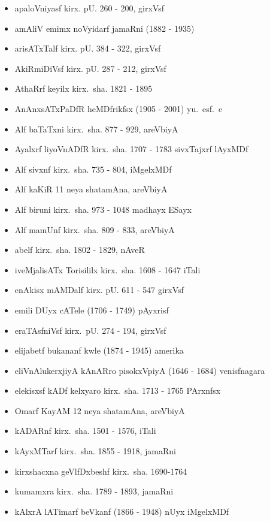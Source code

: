{\renewcommand\labelitemi{}
\begin{itemize}
\item apaloVniyasf kirx. pU. {\rm 260 - 200}, girxVsf
\item amAliV emimx noVyidarf jamaRni {\rm (1882 - 1935)}
\item arisATxTalf kirx. pU. {\rm 384 - 322}, girxVsf
\item AkiRmiDiVsf kirx. pU. {\rm 287 - 212}, girxVsf
\item AthaRrf keyilx kirx.~sha. {\rm 1821 - 1895}
\item AnAnxsATxPaDfR heMDfrikfsx {\rm (1905 - 2001)} yu.~esf.~e
\item Alf baTaTxni kirx.~sha. {\rm 877 - 929}, areVbiyA
\item Ayalxrf liyoVnADfR kirx.~sha. {\rm 1707 - 1783} sivxTajxrf lAyxMDf
\item Alf sivxnf kirx.~sha. {\rm 735 - 804}, iMgelxMDf
\item Alf kaKiR {\rm 11} neya shatamAna, areVbiyA
\item Alf biruni kirx.~sha. {\rm 973 - 1048} madhayx ESayx
\item Alf mamUnf kirx.~sha. {\rm 809 - 833}, areVbiyA
\item abelf kirx.~sha. {\rm 1802 - 1829}, nAveR
\item iveMjalisATx Torisililx kirx.~sha. {\rm 1608 - 1647} iTali
\item enAkisx mAMDalf kirx. pU. {\rm 611 - 547} girxVsf
\item emili DUyx cATele {\rm (1706 - 1749)} pAyxrisf
\item eraTAsfniVsf kirx.~pU. {\rm 274 - 194}, girxVsf
\item elijabetf bukananf kwle {\rm (1874 - 1945)} amerika
\item eliVnAlukerxjiyA kAnARro pisokxVpiyA {\rm (1646 - 1684)} venisfnagara
\item elekisxsf kADf kelxyaro kirx.~sha. {\rm 1713 - 1765} PArxnfsx
\item Omarf KayAM {\rm 12} neya shatamAna, areVbiyA
\item kADARnf kirx.~sha. {\rm 1501 - 1576}, iTali
\item kAyxMTarf kirx.~sha. {\rm 1855 - 1918}, jamaRni
\item kirxshacxna geVlfDxbeshf kirx.~sha. {\rm 1690-1764}
\item kumamxra kirx.~sha. {\rm 1789 - 1893}, jamaRni
\item kAlxrA lATimarf beVkanf {\rm (1866 - 1948)} nUyx iMgelxMDf

\end{itemize}}
